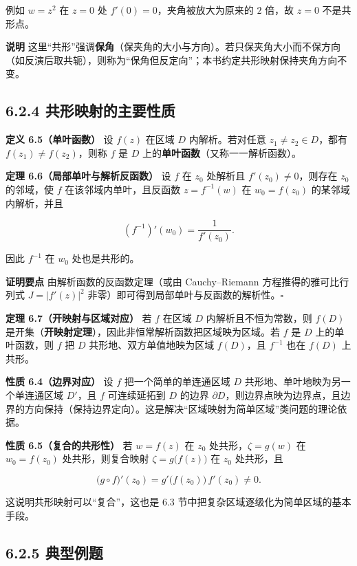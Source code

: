 例如 \(w=z^2\) 在 \(z=0\) 处 \(f'(0)=0\)，夹角被放大为原来的 \(2\)
倍，故 \(z=0\) 不是共形点。

\textbf{说明}
这里``共形''强调\textbf{保角}（保夹角的大小与方向）。若只保夹角大小而不保方向（如反演后取共轭），则称为``保角但反定向''；本书约定共形映射保持夹角方向不变。

\subsection{6.2.4
共形映射的主要性质}\label{ux5171ux5f62ux6620ux5c04ux7684ux4e3bux8981ux6027ux8d28}

\textbf{定义 6.5（单叶函数）} 设 \(f(z)\) 在区域 \(D\) 内解析。若对任意
\(z_1\neq z_2\in D\)，都有 \(f(z_1)\neq f(z_2)\)，则称 \(f\) 是 \(D\)
上的\textbf{单叶函数}（又称一一解析函数）。

\textbf{定理 6.6（局部单叶与解析反函数）} 设 \(f\) 在 \(z_0\) 处解析且
\(f'(z_0)\neq 0\)，则存在 \(z_0\) 的邻域，使 \(f\)
在该邻域内单叶，且反函数 \(z=f^{-1}(w)\) 在 \(w_0=f(z_0)\)
的某邻域内解析，并且

\[
\left(f^{-1}\right)'(w_0)=\frac{1}{f'(z_0)} .
\]

因此 \(f^{-1}\) 在 \(w_0\) 处也是共形的。

\textbf{证明要点} 由解析函数的反函数定理（或由 Cauchy--Riemann
方程推得的雅可比行列式 \(J=|f'(z)|^{2}\)
非零）即可得到局部单叶与反函数的解析性。\(\square\)

\textbf{定理 6.7（开映射与区域对应）} 若 \(f\) 在区域 \(D\)
内解析且不恒为常数，则 \(f(D)\)
是开集（\textbf{开映射定理}），因此非恒常解析函数把区域映为区域。若
\(f\) 是 \(D\) 上的单叶函数，则 \(f\) 把 \(D\)
共形地、双方单值地映为区域 \(f(D)\)，且 \(f^{-1}\) 也在 \(f(D)\)
上共形。

\textbf{性质 6.4（边界对应）} 设 \(f\) 把一个简单的单连通区域 \(D\)
共形地、单叶地映为另一个单连通区域 \(D'\)，且 \(f\) 可连续延拓到 \(D\)
的边界
\(\partial D\)，则边界点映为边界点，且边界的方向保持（保持边界定向）。这是解决``区域映射为简单区域''类问题的理论依据。

\textbf{性质 6.5（复合的共形性）} 若 \(w=f(z)\) 在 \(z_0\)
处共形，\(\zeta=g(w)\) 在 \(w_0=f(z_0)\) 处共形，则复合映射
\(\zeta=g\bigl(f(z)\bigr)\) 在 \(z_0\) 处共形，且

\[
\bigl(g\circ f\bigr)'(z_0)=g'\bigl(f(z_0)\bigr)\,f'(z_0)\neq 0 .
\]

这说明共形映射可以``复合''，这也是 6.3
节中把复杂区域逐级化为简单区域的基本手段。

\subsection{6.2.5 典型例题}\label{ux5178ux578bux4f8bux9898-3}

